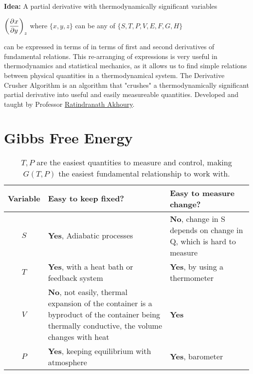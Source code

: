 \documentclass{article}
\date{Winter 2022}
\author{\EC}
\begin{document}
\maketitle
\noindent\textbf{Idea:} A partial derivative with thermodynamically significant variables
\begin{center}
    $\displaystyle\qty(\pder{x}{y})_z$ where $\{x,y,z\}$ can be any of $\{S,T,P,V,E,F,G,H\}$
\end{center}
can be expressed in terms of in terms of first and second derivatives of fundamental relations. This re-arranging of expressions is very useful in thermodynamics and statistical mechanics, as it allows us to find simple relations between physical quantities in a thermodynamical system. The 
Derivative Crusher Algorithm is an algorithm that "crushes" a thermodynamically significant partial derivative into useful and easily measureable quantities. Developed and taught by Professor \hyperlink{https://lsa.umich.edu/physics/people/faculty/akhoury.html}{ Ratindranath Akhoury}.
\section{Gibbs Free Energy}
    \begin{table}[H]
        \renewcommand{\arraystretch}{1.5}
        \centering
        \begin{tabular}{|c|m{5.5cm}|m{5cm}|}
            \hline
            Variable & Easy to keep fixed? & Easy to measure change? 
            \\\hline
            $S$ & \textcolor{SpringGreen3}{\textbf{Yes}}, Adiabatic processes & \textcolor{OrangeRed3}{\textbf{No}}, change in S depends on change in Q, which is hard to measure
            \\\hline
            $T$ & \textcolor{SpringGreen3}{\textbf{Yes}}, with a heat bath or feedback system& \textcolor{SpringGreen3}{\textbf{Yes}}, by using a thermometer
            \\\hline
            $V$ & \textcolor{OrangeRed3}{\textbf{No}}, not easily, thermal expansion of the container is a byproduct of the container being thermally conductive, the volume changes with heat & \textcolor{SpringGreen3}{\textbf{Yes}}
            \\\hline
            $P$ & \textcolor{SpringGreen3}{\textbf{Yes}}, keeping equilibrium with atmosphere & \textcolor{SpringGreen3}{\textbf{Yes}}, barometer
            \\\hline
        \end{tabular}
        \caption{$T,P$ are the easiest quantities to measure and control, making $G(T,P)$ the easiest fundamental relationship to work with.}
    \end{table}
    \newpage
\end{document}
